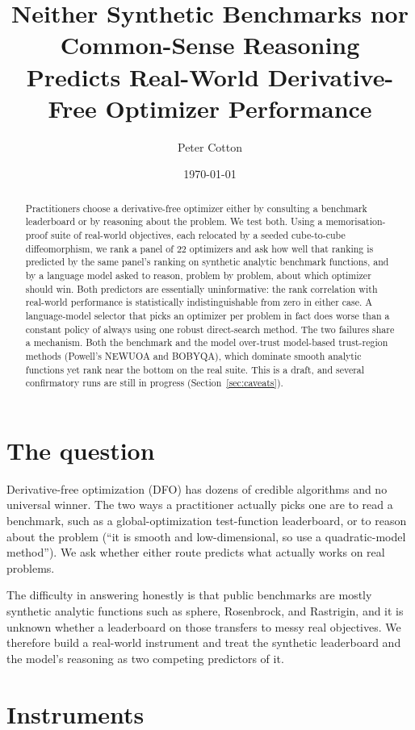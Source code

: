 \documentclass[11pt]{article}
\title{Neither Synthetic Benchmarks nor Common-Sense Reasoning\\
Predicts Real-World Derivative-Free Optimizer Performance}
\author{Peter Cotton}
\date{\today}
\begin{document}
\maketitle

\begin{abstract}
Practitioners choose a derivative-free optimizer either by consulting a benchmark
leaderboard or by reasoning about the problem. We test both. Using a
memorisation-proof suite of real-world objectives, each relocated by a seeded
cube-to-cube diffeomorphism, we rank a panel of $22$ optimizers and ask how well that
ranking is predicted by the same panel's ranking on synthetic analytic benchmark
functions, and by a language model asked to reason, problem by problem, about which
optimizer should win. Both predictors are essentially uninformative: the rank
correlation with real-world performance is statistically indistinguishable from zero
in either case. A language-model selector that picks an optimizer per problem in fact
does worse than a constant policy of always using one robust direct-search method. The
two failures share a mechanism. Both the benchmark and the model over-trust
model-based trust-region methods (Powell's NEWUOA and BOBYQA), which dominate smooth
analytic functions yet rank near the bottom on the real suite. This is a draft, and
several confirmatory runs are still in progress (Section~\ref{sec:caveats}).
\end{abstract}

\section{The question}

Derivative-free optimization (DFO) has dozens of credible algorithms and no universal
winner. The two ways a practitioner actually picks one are to read a benchmark, such as
a global-optimization test-function leaderboard, or to reason about the problem (``it
is smooth and low-dimensional, so use a quadratic-model method''). We ask whether
either route predicts what actually works on real problems.

The difficulty in answering honestly is that public benchmarks are mostly synthetic
analytic functions such as sphere, Rosenbrock, and Rastrigin, and it is unknown whether
a leaderboard on those transfers to messy real objectives. We therefore build a
real-world instrument and treat the synthetic leaderboard and the model's reasoning as
two competing predictors of it.

\section{Instruments}
\end{document}
